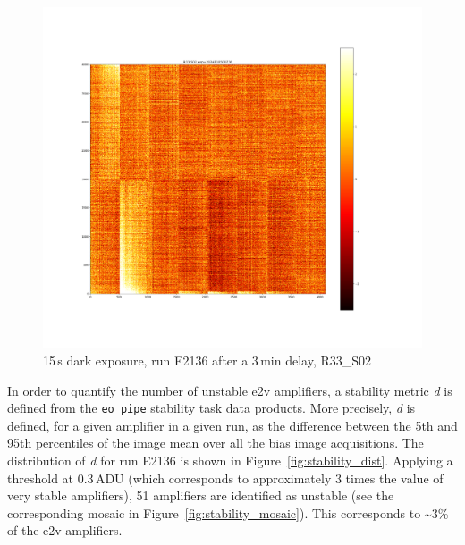 \begin{figure}[htbp]
\vspace{0.5cm}

\begin{minipage}{0.45\textwidth}
    \centering
    \includegraphics[width=\textwidth]{figures/E2136_dark15_delay_R33_S02.png}
    \caption{15\,s dark exposure, run E2136 after a 3\,min delay, R33\_S02}
    \label{fig:r33_s02_2136_delay}
\end{minipage}
\hfill
\begin{minipage}{0.45\textwidth}
    \centering
\end{minipage}
\end{figure}

In order to quantify the number of unstable e2v amplifiers, a stability
metric \emph{d} is defined from the {\tt eo\_pipe}
stability task data products. More precisely, \emph{d} is defined, for a
given amplifier in a given run, as the difference between the 5th and
95th percentiles of the image mean over all the bias image acquisitions. The
distribution of \emph{d} for run E2136 is shown in Figure~\ref{fig:stability_dist}. Applying a
threshold at 0.3\,ADU (which corresponds to approximately 3 times the value of very stable amplifiers), 51 amplifiers are identified as unstable (see the
corresponding mosaic in Figure~\ref{fig:stability_mosaic}). This corresponds to \sim3\% of the e2v
amplifiers.

